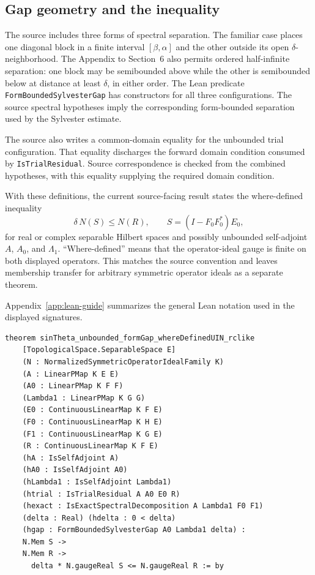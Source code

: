 \documentclass[11pt]{article}
\begin{document}
\subsection{Gap geometry and the inequality}

The source includes three forms of spectral separation.  The familiar case
places one diagonal block in a finite interval $[\beta,\alpha]$ and the other
outside its open $\delta$-neighborhood.  The Appendix to Section~6 also permits
ordered half-infinite separation: one block may be semibounded above while the
other is semibounded below at distance at least $\delta$, in either order.  The
Lean predicate \texttt{FormBoundedSylvesterGap} has constructors for all three
configurations.  The source spectral hypotheses imply the corresponding
form-bounded separation used by the Sylvester estimate.

The source also writes a common-domain equality for the unbounded trial
configuration.  That equality discharges the forward domain condition consumed
by \texttt{IsTrialResidual}.  Source correspondence is checked from the combined
hypotheses, with this equality supplying the required domain condition.

With these definitions, the current source-facing result states the
where-defined inequality
\begin{equation}
  \delta\,N(S)\leq N(R),
  \qquad S=(I-F_0F_0^*)E_0,
  \label{eq:dk-sine}
\end{equation}
for real or complex separable Hilbert spaces and possibly unbounded
self-adjoint $A$, $A_0$, and $\Lambda_1$.  ``Where-defined'' means that the
operator-ideal gauge is finite on both displayed operators.  This matches the
source convention and leaves membership transfer for arbitrary symmetric
operator ideals as a separate theorem.

Appendix~\ref{app:lean-guide} summarizes the general Lean notation used in the
displayed signatures.

\begin{lstlisting}[style=leanpaper,
  caption={Lean signature for the current source-facing theorem, abbreviated for
  readability.  Here \texttt{S} denotes the inlined rectangular map
  $(I-F_0F_0^*)E_0$; the exact Lean source uses the same theorem name and
  expands \texttt{S} in both membership and gauge expressions.},
  label={lst:dk-sintheta-headline}]
theorem sinTheta_unbounded_formGap_whereDefinedUIN_rclike
    [TopologicalSpace.SeparableSpace E]
    (N : NormalizedSymmetricOperatorIdealFamily K)
    (A : LinearPMap K E E)
    (A0 : LinearPMap K F F)
    (Lambda1 : LinearPMap K G G)
    (E0 : ContinuousLinearMap K F E)
    (F0 : ContinuousLinearMap K H E)
    (F1 : ContinuousLinearMap K G E)
    (R : ContinuousLinearMap K F E)
    (hA : IsSelfAdjoint A)
    (hA0 : IsSelfAdjoint A0)
    (hLambda1 : IsSelfAdjoint Lambda1)
    (htrial : IsTrialResidual A A0 E0 R)
    (hexact : IsExactSpectralDecomposition A Lambda1 F0 F1)
    (delta : Real) (hdelta : 0 < delta)
    (hgap : FormBoundedSylvesterGap A0 Lambda1 delta) :
    N.Mem S ->
    N.Mem R ->
      delta * N.gaugeReal S <= N.gaugeReal R := by
\end{lstlisting}
\end{document}
